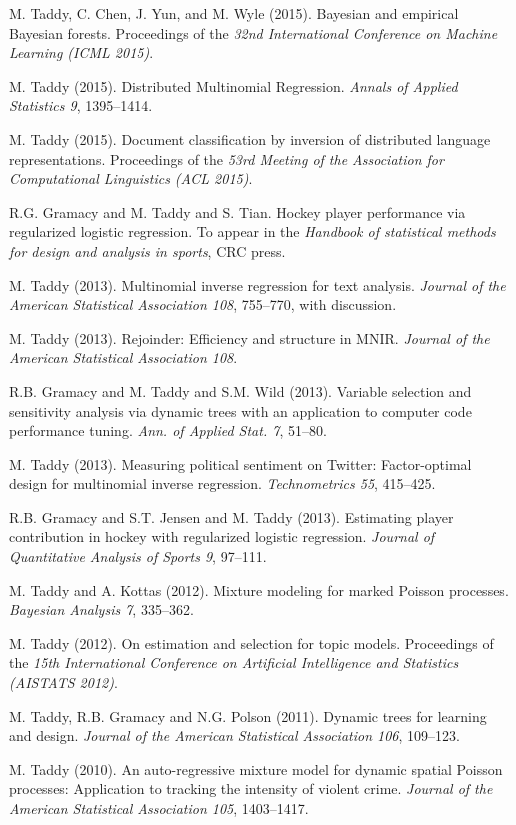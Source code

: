 \documentclass[margin,line]{res}
\begin{document}
\begin{resume}
M. Taddy, C. Chen, J. Yun, and M. Wyle (2015). Bayesian and empirical Bayesian forests.  Proceedings of the {\em 32nd International Conference on Machine Learning (ICML 2015)}.

M. Taddy (2015). Distributed Multinomial Regression.  {\em Annals of Applied Statistics 9}, 1395--1414.

M. Taddy (2015). Document classification by inversion of distributed language representations. Proceedings of the {\em 53rd Meeting of the Association for Computational Linguistics (ACL 2015)}.

R.G. Gramacy and M. Taddy and S. Tian.  Hockey player performance via regularized logistic regression.
To appear in the {\it Handbook of statistical methods for design and analysis in sports}, CRC press.


M. Taddy (2013).  Multinomial inverse regression for text analysis.  
{\it Journal of the American Statistical
  Association 108}, 755--770, with discussion.

M. Taddy (2013).   Rejoinder: Efficiency and structure in MNIR.  {\it Journal of the American Statistical
  Association 108}.




R.B. Gramacy and M. Taddy and S.M. Wild (2013).  Variable selection and
sensitivity analysis via dynamic trees with an application to computer
code performance tuning.  {\it Ann. of Applied
  Stat. 7}, 51--80.

M. Taddy (2013).  Measuring political sentiment on Twitter: Factor-optimal
design for multinomial inverse regression. {\it
  Technometrics 55}, 415--425.


R.B. Gramacy and S.T. Jensen and M. Taddy (2013).  Estimating player contribution in 
hockey with regularized logistic regression. {\it Journal of Quantitative Analysis of Sports 9}, 97--111.

M.  Taddy and A. Kottas (2012). Mixture modeling for marked Poisson processes.
{\it Bayesian Analysis 7}, 335--362.


M. Taddy (2012). On estimation and selection for topic models. Proceedings of the {\it 15th International Conference on
  Artificial Intelligence and Statistics (AISTATS 2012)}.


M. Taddy, R.B. Gramacy and N.G. Polson (2011). Dynamic trees for learning and design.
 {\it Journal of the American Statistical
  Association 106}, 109--123.

M. Taddy (2010). An auto-regressive mixture model for dynamic spatial
Poisson processes: Application to tracking the intensity of violent
crime.  {\it Journal of the American Statistical
  Association 105}, 1403--1417.


\end{resume}
\end{document}
